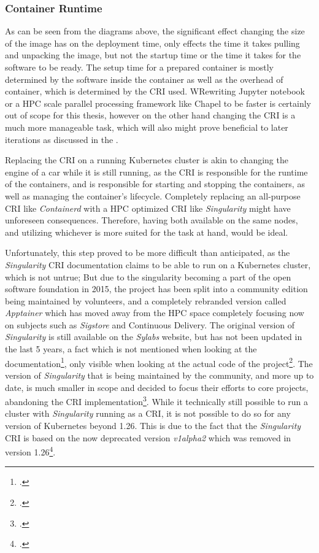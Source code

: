 \subsubsection{Container Runtime}
\label{sec:container_runtime}

As can be seen from the diagrams above, the significant effect changing the size of the image has on the deployment time,
only effects the time it takes pulling and unpacking the image, but not the startup time or the time it takes for the software to be ready.
The setup time for a prepared container is mostly determined by the software inside the container as well as the overhead of container,
which is determined by the \ac{CRI} used.
WRewriting Jupyter notebook or a \ac{HPC} scale parallel processing framework like Chapel to be faster is certainly out of
scope for this thesis, however on the other hand changing the \ac{CRI} is a much more manageable task,
which will also might prove beneficial to later iterations as discussed in the .

Replacing the \ac{CRI} on a running Kubernetes cluster is akin to changing the engine of a car while it
is still running, as the \ac{CRI} is responsible for the runtime of the containers, and is responsible for
starting and stopping the containers, as well as managing the container's lifecycle.
Completely replacing an all-purpose \ac{CRI} like \textit{Containerd} with a
\ac{HPC} optimized \ac{CRI} like \textit{Singularity} might have unforeseen consequences.
Therefore, having both available on the same nodes, and utilizing whichever is more suited for the task at hand,
would be ideal.

Unfortunately, this step proved to be more difficult than anticipated,
as the \textit {Singularity} \ac{CRI} documentation claims to be able to run on a Kubernetes cluster,
which is not untrue;
But due to the singularity becoming a part of the open software foundation in 2015,
the project has been split into a community edition being maintained by volunteers,
and a completely rebranded version called \textit{Apptainer} which has moved away
from the \ac{HPC} space completely focusing now on subjects such as \textit{Sigstore} and Continuous Delivery.
The original version of \textit{Singularity} is still available on the \textit{Sylabs} website,
but has not been updated in the last 5 years, a fact which is not mentioned
when looking at the documentation\footcite{singularity-docsIntegratingKubernetesSingularity},
only visible when looking at the actual code of the project\footcite{singularity-repoSylabsSingularitycriSingularity}.
The version of \textit{Singularity} that is being maintained by the community, and more up to date,
is much smaller in scope and decided to focus their efforts to core projects,
abandoning the \ac{CRI} implementation\footcite{singularity-repoSylabsSingularitycriSingularity}.
While it technically still possible to run a cluster with \textit{Singularity} running as a \ac{CRI},
it is not possible  to do so for any version of Kubernetes beyond 1.26.
This is due to the fact that the \textit{Singularity} \ac{CRI} is based on the now deprecated version \textit{v1alpha2}
which was removed in version 1.26\footcite{kubernetes1.26releaseteamKubernetesV1262022}.


